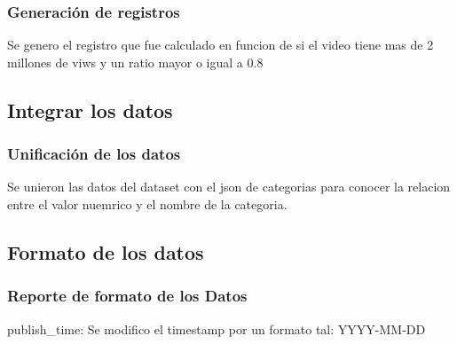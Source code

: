     \subsubsection{Generación de registros}
        Se genero el registro  que fue calculado en funcion de si
        el video tiene mas de 2 millones de viws y un ratio mayor o igual a 0.8
\subsection{Integrar los datos}
    \subsubsection{Unificación de los datos}
        Se unieron las datos del dataset con el json de categorias para conocer
        la relacion entre el valor nuemrico y el nombre de la categoria.
\subsection{Formato de los datos}
    \subsubsection{Reporte de formato de los Datos}
        publish\_time: Se modifico el timestamp por un formato tal: YYYY-MM-DD
